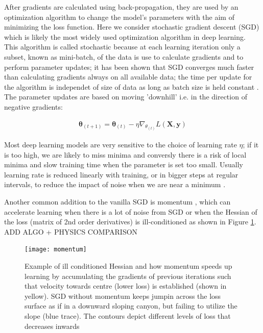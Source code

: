 \documentclass{report}
\begin{document}
After gradients are calculated using back-propagation, they are used by an optimization algorithm to change the model's parameters with the aim of minimizing the loss function. Here we consider stochastic gradient descent (SGD) \cite{Robbins1951} which is likely the most widely used optimization algorithm in deep learning. This algorithm is called stochastic because at each learning iteration only a subset, known as mini-batch, of the data is use to calculate gradients and to perform parameter updates; it has been shown that SGD converges much faster than calculating gradients always on all available data; the time per update for the algorithm is independet of size of data as long as batch size is held constant \cite{Goodfellow2016}. The parameter updates are based on moving 'downhill' i.e. in the direction of negative gradients:

\begin{align} \label{sgd_eq}
  \pmb{\theta}_{(t+1)}=\pmb{\theta}_{(t)} - \eta \nabla_{\theta_{(t)}}L(\mathbf{X}, \mathbf{y})
\end{align}

Most deep learning models are very sensitive to the choice of learning rate $\eta$; if it is too high, we are likely to miss minima and conversly there is a risk of local minima and slow training time when the parameter is set too small. Usually learning rate is reduced linearly with training, or in bigger steps at regular intervals, to reduce the impact of noise when we are near a minimum \cite{Goodfellow2016}.

Another common addition to the vanilla SGD is momentum \cite{Rumelhart1985}, which can accelerate learning when there is a lot of noise from SGD or when the Hessian of the loss (matrix of 2nd order derivatives) is ill-conditioned as shown in Figure \ref{fig:momentum}. ADD ALGO + PHYSICS COMPARISON

\begin{figure}
  \centering
	\texttt{[image: momentum]}
	\caption{Example of ill conditioned Hessian and how momentum speeds up learning by accumulating the gradients of previous iterations such that velocity towards centre (lower loss) is established (shown in yellow). SGD without momentum keeps jumpin across the loss surface as if in a downward sloping canyon, but failing to utilize the slope (blue trace). The contours depict different levels of loss that decreases inwards}
	\label{fig:momentum}
\end{figure}
\end{document}
